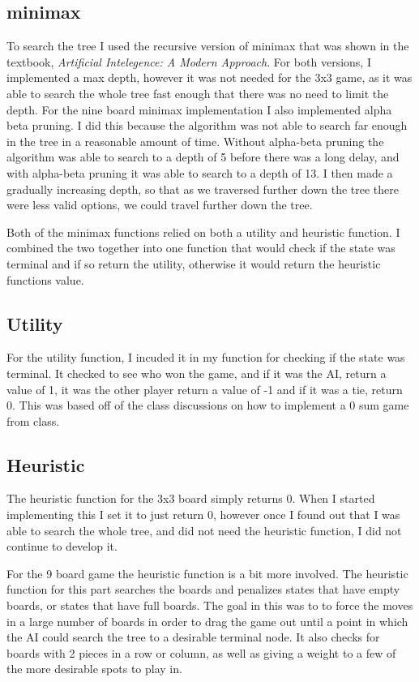 \documentclass{article}
\begin{document}
\subsection{minimax}
To search the tree I used the recursive version of minimax that was shown in the
textbook, \textit{Artificial Intelegence: A Modern Approach}. For both versions,
I implemented a max depth, however it was not needed for the 3x3 game, as it was
able to search the whole tree fast enough that there was no need to limit the depth.
For the nine board minimax implementation I also implemented alpha beta pruning. I
did this because the algorithm was not able to search far enough in the tree in a
reasonable amount of time. Without alpha-beta pruning the algorithm was able to search
to a depth of 5 before there was a long delay, and with alpha-beta pruning it was
able to search to a depth of 13. I then made a gradually increasing depth, so that
as we traversed further down the tree there were less valid options, we could travel further
down the tree.

Both of the minimax functions relied on both a utility and heuristic function. I
combined the two together into one function that would check if the state was terminal
and if so return the utility, otherwise it would return the heuristic functions value.

\subsection{Utility}
For the utility function, I incuded it in my function for checking if the state was
terminal. It checked to see who won the game, and if it was the AI, return a value of 1,
it was the other player return a value of -1 and if it was a tie, return 0. This
was based off of the class discussions on how to implement a 0 sum game from class.

\subsection{Heuristic}
The heuristic function for the 3x3 board simply returns 0. When I started implementing this
I set it to just return 0, however once I found out that I was able to search the whole
tree, and did not need the heuristic function, I did not continue to develop it.

For the 9 board game the heuristic function is a bit more involved. The heuristic
function for this part searches the boards and penalizes states that have empty
boards, or states that have full boards. The goal in this was to to force the moves
in a large number of boards in order to drag the game out until a point in which the
AI could search the tree to a desirable terminal node. It also checks for boards with
2 pieces in a row or column, as well as giving a weight to a few of the more desirable
spots to play in.
\end{document}
